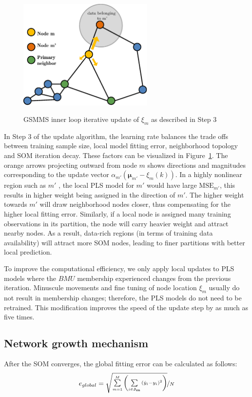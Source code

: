 \documentclass[review,3p]{elsarticle}
\renewcommand\[{\begin{equation}}
\renewcommand\]{\end{equation}}
\begin{document}
\begin{figure}[!htpb]
  \centering
  \includegraphics[width=0.6\textwidth]{figures/gsmms/gsmms_update.eps}\\
  \caption{GSMMS inner loop iterative update of $\xi_m$ as described in Step 3}\label{fig:gsmms_update}
\end{figure}
In Step 3 of the update algorithm, the learning rate balances the trade offs
between training sample size, local model fitting error, neighborhood
topology and SOM iteration decay. These factors can be visualized in
Figure~\ref{fig:gsmms_update}. The orange arrows projecting outward from node
$m$ shows directions and magnitudes corresponding to the update vector
${{\alpha _{m'}}\left( {{{\mathbf{\mu}}_{m'}} - {\xi _m}\left( k \right)}
\right)}$. In a highly nonlinear region such as $m'$ , the local PLS model
for $m'$ would have large $\mathrm{MSE}_{m'}$, this results in higher weight being
assigned in the direction of $m'$. 
The higher weight towards $m'$ will draw neighborhood nodes closer, thus compensating for the higher local fitting error.
Similarly, if a local node is assigned many training observations in
its partition, the node will carry heavier weight and attract nearby nodes.
As a result, data-rich regions (in terms of training data availability) will
attract more SOM nodes, leading to finer partitions with better local
prediction.

To improve the computational efficiency, we only apply local updates to PLS models where the $BMU$ membership experienced changes from the previous iteration. Minuscule movements and fine tuning of node location
$\xi_m$ usually do not result in membership changes; therefore, the PLS models do not need to be retrained. This modification
improves the speed of the update step by as much as five times.

\subsection{Network growth mechanism}
After the SOM converges, the global fitting error can be calculated as follows:
\[e_{global} = \nicefrac{\sqrt{\sum\limits_{m = 1}^M {\left( {\sum\limits_{i \in {\bf J_m}}^{} {} {{\left( {{{\hat y}_i} - {y_i}} \right)}^2}} \right)}}}{N} \]
\end{document}
